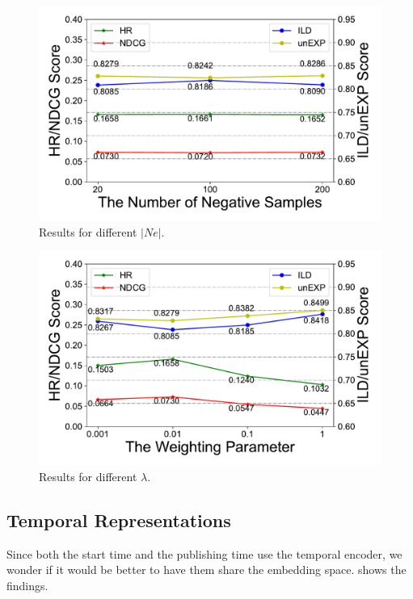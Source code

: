 \begin{figure}[th]
  \centering
  \includegraphics[width=0.8\linewidth]{fig/parameter_a.pdf}  
  \caption{Results for different $|Ne|$.}
\label{fig:para_a}
\end{figure}

\begin{figure}[th]
  \centering
  \includegraphics[width=0.8\linewidth]{fig/parameter_b.pdf}  
  \caption{Results for different $\lambda$.}
  \label{fig:para_b}
\end{figure}

\subsection{Temporal Representations}
\label{sec:t}
Since both the start time and the publishing time use the temporal encoder, 
we wonder if it would be better to have them share the embedding space. 
 shows the findings. 

